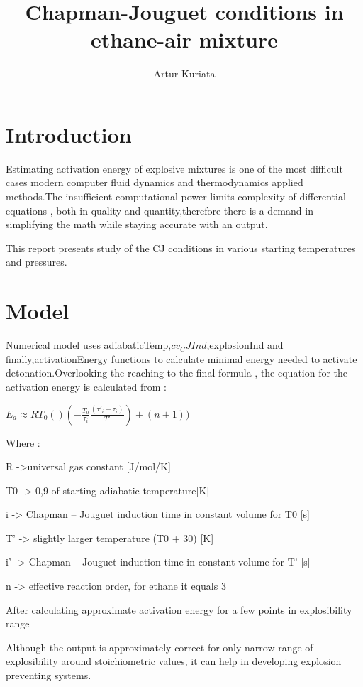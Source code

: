 \documentclass[a4paper]{article}
\title{Chapman-Jouguet conditions in ethane-air mixture}
\author{Artur Kuriata}
\begin{document}
\maketitle


\section{Introduction}

Estimating activation energy of explosive mixtures is one of the most difficult cases modern computer fluid dynamics and thermodynamics applied methods.The insufficient computational power limits complexity of differential equations , both in quality and quantity,therefore there is a demand in simplifying  the math while staying accurate with an output.



This report presents study of the CJ conditions in various starting temperatures and pressures.

\section{Model}
Numerical model uses  adiabaticTemp,$cv_CJInd$,explosionInd and finally,activationEnergy
functions to calculate minimal energy needed to activate detonation.Overlooking the reaching to the final formula , the equation for the activation energy is calculated from :

\(E_{a}\approx RT_{0}()(-\frac{T_{0}}{\tau _{i}}\frac{(\tau'_{i}-\tau_{i})}{T'}) +(n+1))\)





Where :

R	->universal gas constant [J/mol/K]

T0 -> 0,9 of starting adiabatic temperature[K]

i -> Chapman – Jouguet induction time in constant volume for T0 [s]

T’ -> slightly larger temperature (T0 + 30) [K]


i’ -> Chapman – Jouguet induction time in constant volume for T’ [s]


n -> effective reaction order, for ethane it equals 3


After calculating approximate activation energy for a few points in explosibility range



Although the output is approximately correct for only narrow range of explosibility around stoichiometric values, it can help in developing explosion preventing systems.
\end{document}
